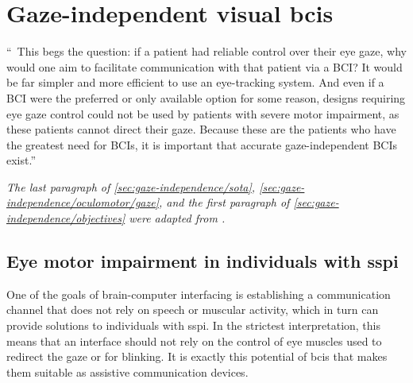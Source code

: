 \chapter{Gaze-independent visual \acsp{bci}}
\label{sec:gaze-independent}
\epigraph{%
  ``\elide\ This begs the question: if a patient had reliable control
  over their eye gaze, why would one aim to facilitate communication with that
  patient via a BCI? It would be far simpler and more efficient to use an
  eye-tracking system.
  And even if a BCI were the preferred or only available option for some reason,
  designs requiring eye gaze control could not be used
  by patients with severe motor impairment, as these patients
  cannot direct their gaze.
  Because these are the patients who have the greatest need for BCIs, it is
  important that accurate gaze-independent BCIs exist.''
}{%
  \textcite{Egan2017}
}

\noindent\emph{The last paragraph of \cref{sec:gaze-independence/sota},
\cref{sec:gaze-independence/oculomotor/gaze}, and the first paragraph of
\cref{sec:gaze-independence/objectives} were adapted from
\textcite{VanDenKerchove2024}.}

\section{Eye motor impairment in individuals with \acl{sspi}}%
\label{sec:gaze-dependence}

One of the goals of brain-computer interfacing is establishing a communication
channel that does not rely on speech or muscular activity, which in turn can
provide solutions to individuals with \ac{sspi}.
In the strictest interpretation, this means that an interface should not
rely on the control of eye muscles used to redirect the gaze or for blinking.
It is exactly this potential of \acp{bci} that makes them suitable as assistive
communication devices.

